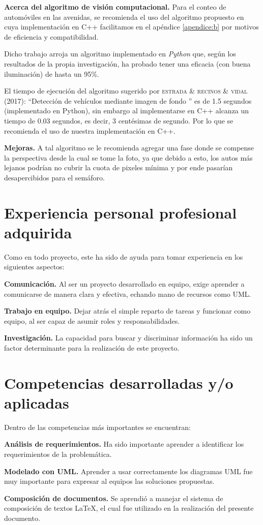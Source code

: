 \textbf{Acerca del algoritmo de visión computacional.}
Para el conteo de automóviles en las avenidas, se recomienda el uso del algoritmo propuesto en \cite{ittap} cuya implementación en C++ facilitamos en el apéndice \ref{apendice:b}  por motivos de eficiencia y compatibilidad. 

Dicho trabajo arroja un algoritmo implementado en \emph{Python} que, según los resultados de la propia investigación, ha probado tener una eficacia (con buena iluminación) de hasta un 95\%.

El tiempo de ejecución del algoritmo sugerido por \textsc{estrada \& recinos \& vidal (2017)}: ``Detección de vehículos mediante imagen de fondo '' es de 1.5 segundos (implementado en Python), sin embargo al implementarse en C++ alcanza un tiempo de 0.03 segundos, es decir, 3 centésimas de segundo. Por lo que se recomienda el uso de nuestra implementación en C++.

\textbf{Mejoras.}
A tal algoritmo se le recomienda agregar una fase donde se compense la perspectiva desde la cual se tome la foto, ya que debido a esto, los autos más lejanos podrían no cubrir la cuota de pixeles mínima y por ende pasarían desapercibidos para el semáforo.

\section{Experiencia personal profesional adquirida}

Como en todo proyecto, este ha sido de ayuda para tomar experiencia en los siguientes aspectos:

\textbf{Comunicación.} Al ser un proyecto desarrollado en equipo, exige aprender a comunicarse de manera clara y efectiva, echando mano de recursos como UML.

\textbf{Trabajo en equipo.} Dejar atrás el simple reparto de tareas y funcionar como equipo, al ser capaz de asumir roles y responsabilidades.

\textbf{Investigación.} La capacidad para buscar y discriminar información ha sido un factor determinante para la realización de este proyecto.


\section{Competencias desarrolladas y/o aplicadas}

Dentro de las competencias más importantes se encuentran:

\textbf{Análisis de requerimientos.} Ha sido importante aprender a identificar los requerimientos de la problemática.

\textbf{Modelado con UML.} Aprender a usar correctamente los diagramas UML fue muy importante para expresar al equipos las soluciones propuestas.

\textbf{Composición de documentos.} Se aprendió a manejar el sistema de composición de textos \LaTeX, el cual fue utilizado en la realización del presente documento. 